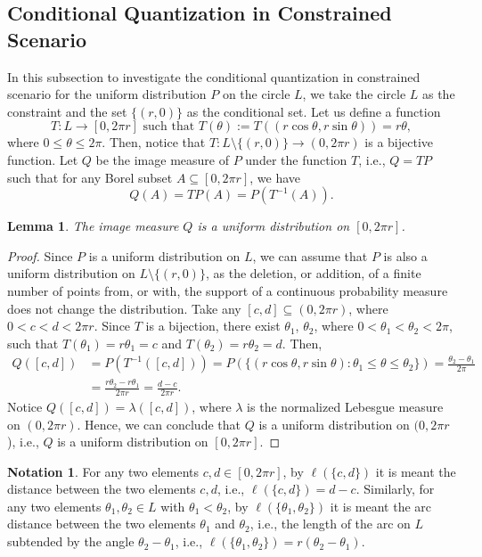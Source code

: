 \documentclass[12pt, reqno]{amsart}
\theoremstyle{plain}
\newtheorem{lemma1}[subsubsection]{Lemma}
\theoremstyle{definition}
\newtheorem{notation1}[subsubsection]{Notation}
\newcommand{\ci}{\subseteq}%
\newcommand{\set}[1]{\{#1\}}%
\newcommand{\gl}{\lambda}
\newcommand{\gq}{\theta}
\newcommand{\te}{\text}%
\begin{document}
\subsection{Conditional Quantization in Constrained Scenario} \label{sub1}
In this subsection to investigate the conditional quantization in constrained scenario for the uniform distribution $P$ on the circle $L$, we take the circle $L$ as the constraint and the set $\set{(r, 0)}$ as the conditional set. 
Let us define a function 
\[T : L \to [0, 2\pi r]  \te{ such that } T(\gq):=T((r\cos \gq, r\sin \gq))=r \gq,\] where $0\leq \gq\leq 2 \pi$. Then, notice that $T : L\setminus \set{(r, 0)} \to (0, 2\pi r) $ is a bijective function. Let $Q$ be the image measure of $P$ under the function $T$, i.e., $Q=TP$ such that for any Borel subset $A \ci [0, 2\pi r]$, we have 
\[Q(A)=TP(A)=P(T^{-1}(A)).\]
\begin{lemma1} \label{lemma21} 
The image measure $Q$ is a uniform distribution on $[0, 2\pi r]$. 
\end{lemma1} 
\begin{proof}
Since $P$ is a uniform distribution on $L$, we can assume that $P$ is also a uniform distribution on $L\setminus \set{(r, 0)}$, as the deletion, or addition, of a finite number of points from, or with, the support of a continuous probability measure does not change the distribution. 
Take any $[c, d]\ci (0, 2\pi r)$, where $0< c<d<2\pi r$. Since $T$ is a bijection, there exist $\gq_1$, $\gq_2$, where $0< \gq_1<\gq_2<2\pi $, such that $T(\gq_1)=r\gq_1=c$ and $T(\gq_2)=r\gq_2=d$. Then,   
\begin{align*}
Q([c, d])&=P(T^{-1}([c, d]))=P(\set{(r\cos \gq, r\sin \gq) : \gq_1\leq \gq\leq \gq_2})=\frac{\gq_2-\gq_1}{2\pi}\\
&=\frac{r\gq_2-r\gq_1}{2\pi r}=\frac {d-c}{2\pi r}.
\end{align*}
Notice $Q([c, d])=\gl([c, d])$, where $\gl$ is the normalized Lebesgue measure on $(0, 2\pi r)$. Hence, we can conclude that $Q$ is a uniform distribution on $(0, 2\pi r$), i.e., $Q$ is a uniform distribution on $[0, 2\pi r]$. 
\end{proof} 


\begin{notation1}
For any two elements $c, d\in [0, 2\pi r]$, by $\ell(\set{c, d})$ it is meant the distance between the two elements $c, d$, i.e., $\ell(\set{c, d})=d-c$. Similarly, for any two elements $\gq_1, \gq_2 \in L$ with $\gq_1<\gq_2$, by $\ell(\set{\gq_1, \gq_2})$ it is meant the arc distance between the two elements $\gq_1$ and $\gq_2$, i.e., the length of the arc on $L$ subtended by the angle $\gq_2-\gq_1$, i.e.,  $\ell(\set{\gq_1, \gq_2})=r(\gq_2-\gq_1).$
\end{notation1} 
\end{document}
